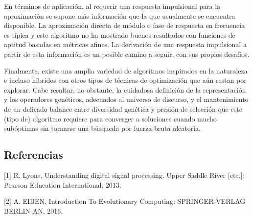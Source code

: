 \documentclass[11pt]{article}
\begin{document}
En términos de aplicación, al requerir una respuesta impulsional para la
aproximación se supone más información que la que usualmente se
encuentra disponible. La aproximación directa de módulo o fase de
respuesta en frecuencia es típica y este algoritmo no ha mostrado buenos
resultados con funciones de aptitud basadas en métricas afines. La
derivación de una respuesta impulsional a partir de esta información es
un posible camino a seguir, con sus propios desafíos.

Finalmente, existe una amplia variedad de algoritmos inspirados en la
naturaleza e incluso híbridos con otros tipos de técnicas de
optimización que aún restan por explorar. Cabe resaltar, no obstante, la
cuidadosa definición de la representación y los operadores genéticos,
adecuados al universo de discurso, y el mantenimiento de un delicado
balance entre diversidad genética y presión de selección que este (tipo
de) algoritmo requiere para converger a soluciones cuando mucho
subóptimas sin tornarse una búsqueda por fuerza bruta aleatoria.

    \subsection{Referencias}\label{referencias}

{[}1{]} R. Lyons, Understanding digital signal processing. Upper Saddle
River {[}etc.{]}: Pearson Education International, 2013.

{[}2{]} A. EIBEN, Introduction To Evolutionary Computing:
SPRINGER-VERLAG BERLIN AN, 2016.


    
    
    
    
\end{document}
